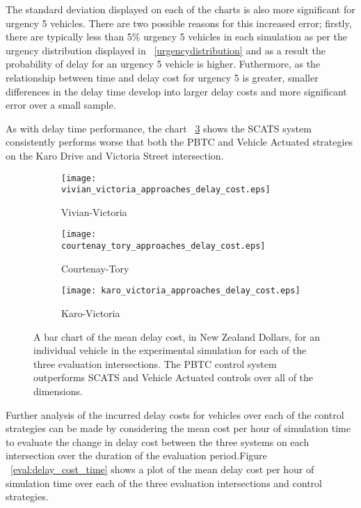  The standard deviation displayed on each of the charts is also more significant for urgency 5 vehicles. There are two possible reasons for this increased error; firstly, there are typically less than 5\% urgency 5 vehicles in each simulation as per the urgency distribution displayed in ~\ref{urgencydistribution} and as a result the probability of delay for an urgency 5 vehicle is higher. Futhermore, as the relationship between time and delay cost for urgency 5 is greater, smaller differences in the delay time develop into larger delay costs and more significant error over a small sample.
 
As with delay time performance, the chart ~\ref{approaches_delay_cost:sub3} shows the SCATS system consistently performs worse that both the PBTC and Vehicle Actuated strategies on the Karo Drive and Victoria Street intersection.

\begin{figure}
\centering
\begin{subfigure}{.5\textwidth}
  \centering
  \texttt{[image: vivian\_victoria\_approaches\_delay\_cost.eps]}
  \caption{Vivian-Victoria}
  \label{approaches_delay_cost:sub1}
\end{subfigure}%
\begin{subfigure}{.5\textwidth}
  \centering
  \texttt{[image: courtenay\_tory\_approaches\_delay\_cost.eps]}
  \caption{Courtenay-Tory}
  \label{approaches_delay_cost:sub2}
\end{subfigure}

\vspace{1cm}

\begin{subfigure}{.5\textwidth}
  \centering
  \texttt{[image: karo\_victoria\_approaches\_delay\_cost.eps]}
  \caption{Karo-Victoria}
  \label{approaches_delay_cost:sub3}
\end{subfigure}%
\caption{ A bar chart of the mean delay cost, in New Zealand Dollars, for an individual vehicle in the experimental simulation for each of the three evaluation intersections. The PBTC control system outperforms SCATS and Vehicle Actuated controls over all of the dimensions.  }
\label{eval:approaches_delay_cost}
\end{figure}

Further analysis of the incurred delay costs for vehicles over each of the control strategies can be made by considering the mean cost per hour of simulation time to evaluate the change in delay cost between the three systems on each intersection over the duration of the evaluation period.Figure  ~\ref{eval:delay_cost_time} shows a plot of the mean delay cost per hour of simulation time over each of the three evaluation intersections and control strategies. 

